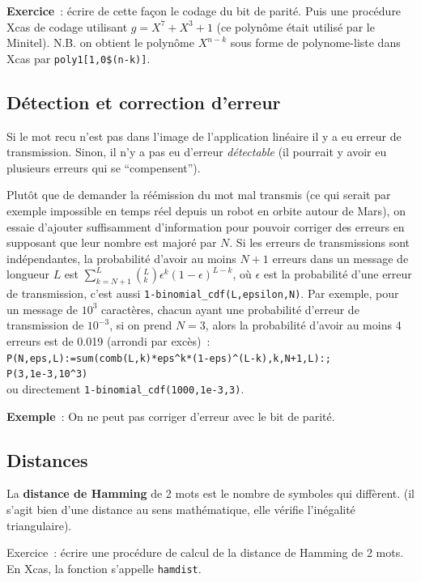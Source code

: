 \documentclass[a4paper,11pt]{book}
\begin{document}
\begin{giacjshere}
{\bf Exercice}~: écrire de cette façon le codage du bit de parité. Puis
une proc\'edure Xcas de codage utilisant $g=X^7+X^3+1$ 
(ce polynôme était utilisé par le Minitel).
N.B. on obtient le polynôme $X^{n-k}$ sous forme
de polynome-liste dans Xcas par {\tt poly1[1,0\$(n-k)]}.

\subsection{D\'etection et correction d'erreur}
 
Si le mot recu n'est pas dans l'image de l'application
lin\'eaire il y a eu erreur de transmission. Sinon, il n'y
a pas eu d'erreur {\em d\'etectable\/} (il pourrait y avoir eu plusieurs
erreurs qui se ``compensent'').

Plut\^ot que de demander la r\'e\'emission du mot mal transmis
(ce qui serait par exemple impossible en temps réel 
depuis un robot en orbite autour de Mars),
on essaie d'ajouter suffisamment d'information pour 
pouvoir corriger des erreurs en supposant
que leur nombre est major\'e par $N$. 
Si les erreurs de
transmissions sont ind\'ependantes, la probabilit\'e d'avoir
au moins $N+1$ erreurs dans un message de longueur $L$
est $\sum_{k=N+1}^L \left( ^L_{k} \right) \epsilon^{k} (1-\epsilon)^{L-k}$, 
o\`u $\epsilon$ est la probabilit\'e d'une erreur
de transmission, c'est aussi \verb|1-binomial_cdf(L,epsilon,N)|. 
Par exemple, pour un message de $10^3$ caract\`eres,
chacun ayant une probabilit\'e d'erreur de transmission de $10^{-3}$,
si on prend $N=3$, alors la probabilit\'e d'avoir au moins 4 erreurs
est de 0.019 (arrondi par exc\`es)~:\\
\verb|P(N,eps,L):=sum(comb(L,k)*eps^k*(1-eps)^(L-k),k,N+1,L):;|\\
\verb|P(3,1e-3,10^3)|\\
ou directement \verb|1-binomial_cdf(1000,1e-3,3)|.

{\bf Exemple}~: On ne peut pas corriger d'erreur avec le bit de parité.

\subsection{Distances} 
La {\bf distance de Hamming} 
de 2 mots est le nombre de symboles qui diffèrent.
(il s'agit bien d'une distance au sens mathématique, 
elle v\'erifie l'in\'egalit\'e triangulaire). 

Exercice~: écrire une procédure de calcul de la distance de Hamming
de 2 mots. En Xcas, la fonction s'appelle {\tt hamdist}.


\end{giacjshere}
\end{document}
